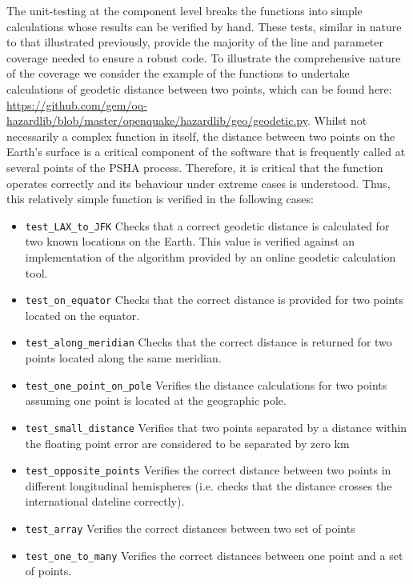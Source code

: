 The unit-testing at the component level breaks the functions into simple calculations whose results can be verified by hand. These tests, similar in nature to that illustrated previously, provide the majority of the line and parameter coverage needed to ensure a robust code. To illustrate the comprehensive nature of the coverage we consider the example of the functions to undertake calculations of geodetic distance between two points, which can be found here: \href{https://github.com/gem/oq-hazardlib/blob/master/openquake/hazardlib/geo/geodetic.py}{https://github.com/gem/oq-hazardlib/blob/master/openquake/hazardlib/geo/geodetic.py}. Whilst not necessarily a complex function in itself, the distance between two points on the Earth's surface is a critical component of the software that is frequently called at several points of the PSHA process. Therefore, it is critical that the function operates correctly and its behaviour under extreme cases is understood. Thus, this relatively simple function is verified in the following cases:

\begin{itemize}
\item \verb=test_LAX_to_JFK= Checks that a correct geodetic distance is calculated for two known locations on the Earth. This value is verified against an implementation of the algorithm provided by an online geodetic calculation tool.
\item \verb=test_on_equator= Checks that the correct distance is provided for two points located on the equator.
\item \verb=test_along_meridian= Checks that the correct distance is returned for two points located along the same meridian.
\item \verb=test_one_point_on_pole= Verifies the distance calculations for two points assuming one point is located at the geographic pole.
\item \verb=test_small_distance= Verifies that two points separated by a distance within the floating point error are considered to be separated by zero km
\item \verb=test_opposite_points= Verifies the correct distance between two points in different longitudinal hemispheres (i.e. checks that the distance crosses the international dateline correctly).
\item \verb=test_array= Verifies the correct distances between two set of points
\item \verb=test_one_to_many= Verifies the correct distances between one point and a set of points.
\end{itemize}

